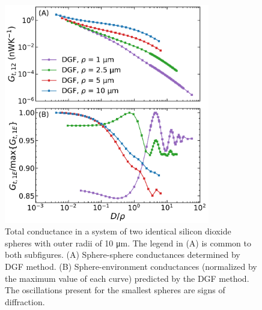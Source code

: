 \begin{figure}
\centering
\includegraphics[width=0.8\textwidth]{./Figures/Fig_MockExperimentDissertation.pdf}
\caption{\label{fig:DistanceDependence} Total conductance in a system of two identical silicon dioxide spheres with outer radii of 10 \si{\micro\meter}. The legend in (A) is common to both subfigures. (A) Sphere-sphere conductances determined by DGF method. (B) Sphere-environment conductances (normalized by the maximum value of each curve) predicted by the DGF method. The oscillations present for the smallest spheres are signs of diffraction.}
\end{figure}

